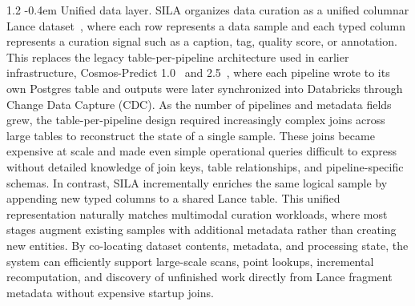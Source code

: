 \documentclass{llmxive}
\makeatletter
\providecommand{\paragraph}{  \@startsection{paragraph}{4}{\z@}    {1\baselineskip \@plus .2\baselineskip}    {-0.4em}    {\normalfont\normalsize\bfseries}}
\makeatother
\begin{document}
\paragraph{Unified data layer.}
SILA organizes data curation as a unified columnar Lance dataset~\citep{pace2025lance}, where each row represents a data sample and each typed column represents a curation signal such as a caption, tag, quality score, or annotation. This replaces the legacy table-per-pipeline architecture used in earlier infrastructure, Cosmos-Predict 1.0~\citep{cosmos_v1} and 2.5~\citep{cosmos_predict2p5}, where each pipeline wrote to its own Postgres table and outputs were later synchronized into Databricks through Change Data Capture (CDC). As the number of pipelines and metadata fields grew, the table-per-pipeline design required increasingly complex joins across large tables to reconstruct the state of a single sample. These joins became expensive at scale and made even simple operational queries difficult to express without detailed knowledge of join keys, table relationships, and pipeline-specific schemas. In contrast, SILA incrementally enriches the same logical sample by appending new typed columns to a shared Lance table. This unified representation naturally matches multimodal curation workloads, where most stages augment existing samples with additional metadata rather than creating new entities. By co-locating dataset contents, metadata, and processing state, the system can efficiently support large-scale scans, point lookups, incremental recomputation, and discovery of unfinished work directly from Lance fragment metadata without expensive startup joins.
\end{document}
